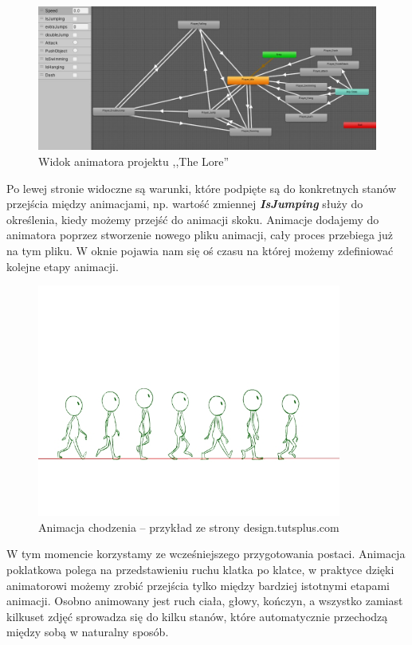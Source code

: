 \documentclass[oneside,polski,logo]{amuthesis}
\begin{document}
\begin{figure}[h]
	\centering
	\includegraphics[width=13cm]{images/kozubal/animator.jpg}
	\caption{Widok animatora projektu ,,The Lore''}
\end{figure}

Po lewej stronie widoczne są warunki, które podpięte są do konkretnych stanów przejścia między animacjami, np. wartość zmiennej \textbf{\textit{IsJumping}} służy do określenia, kiedy możemy przejść do animacji skoku. Animacje dodajemy do animatora poprzez stworzenie nowego pliku animacji, cały proces przebiega już na tym pliku. W oknie pojawia nam się oś czasu na której możemy zdefiniować kolejne etapy animacji.\\

\begin{figure}[h]
	\centering
	\includegraphics[width=10cm]{images/kozubal/walkingAnimation.jpg}
	\caption{Animacja chodzenia – przykład ze strony design.tutsplus.com \cite{animation2}}
\end{figure}

\newpage W tym momencie korzystamy ze wcześniejszego przygotowania postaci. Animacja poklatkowa polega na przedstawieniu ruchu klatka po klatce, w praktyce dzięki animatorowi możemy zrobić przejścia tylko między bardziej istotnymi etapami animacji. Osobno animowany jest ruch ciała, głowy, kończyn, a wszystko zamiast kilkuset zdjęć sprowadza się do kilku stanów, które automatycznie przechodzą między sobą w naturalny sposób.
\end{document}
